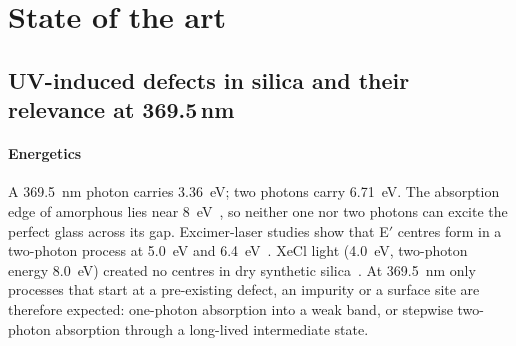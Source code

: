 \section{State of the art}\label{sec:sota}

\subsection{UV-induced defects in silica and their relevance at 369.5\,nm}\label{sec:sota-bulk}
\paragraph{Energetics} A \SI{369.5}{nm} photon carries \SI{3.36}{eV}; two photons carry \SI{6.71}{eV}.
The absorption edge of amorphous  lies near \SI{8}{eV}~\cite{Kajihara2010}, so neither one nor
two photons can excite the perfect glass across its gap. Excimer-laser studies show that E$'$ centres form
in a two-photon process at \SI{5.0}{eV} and \SI{6.4}{eV}~\cite{Arai1988,Tsai1988}. XeCl light
(\SI{4.0}{eV}, two-photon energy \SI{8.0}{eV}) created no centres in dry synthetic
silica~\cite{Arai1988}. At \SI{369.5}{nm} only processes that start at a pre-existing defect, an impurity
or a surface site are therefore expected: one-photon absorption into a weak band, or stepwise two-photon
absorption through a long-lived intermediate state.

